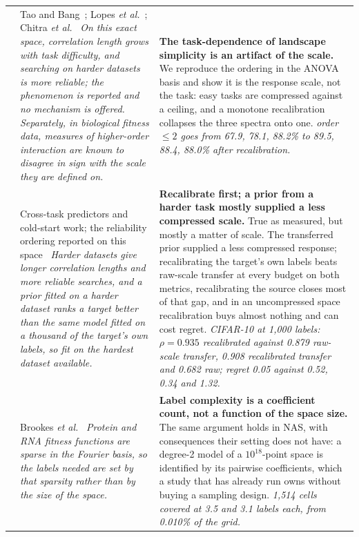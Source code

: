 \begin{table}[!t]
\begin{tabular}{@{}p{}p{}p{}@{}}
\addlinespace[2pt]
3 & Tao and Bang~\cite{tao2024landscape}; Lopes \emph{et al.}~\cite{lopes2024operation}; Chitra \emph{et al.}~\cite{chitra2025resolving} \emph{On this exact space, correlation length grows with task difficulty, and searching on harder datasets is more reliable; the phenomenon is reported and no mechanism is offered. Separately, in biological fitness data, measures of higher-order interaction are known to disagree in sign with the scale they are defined on.} & \textbf{The task-dependence of landscape simplicity is an artifact of the scale.} We reproduce the ordering in the ANOVA basis and show it is the response scale, not the task: easy tasks are compressed against a ceiling, and a monotone recalibration collapses the three spectra onto one. \emph{order $\le 2$ goes from 67.9, 78.1, 88.2\% to 89.5, 88.4, 88.0\% after recalibration.} \\
\addlinespace[2pt]
4 & Cross-task predictors and cold-start work; the reliability ordering reported on this space~\cite{tao2024landscape,lopes2024operation} \emph{Harder datasets give longer correlation lengths and more reliable searches, and a prior fitted on a harder dataset ranks a target better than the same model fitted on a thousand of the target's own labels, so fit on the hardest dataset available.} & \textbf{Recalibrate first; a prior from a harder task mostly supplied a less compressed scale.} True as measured, but mostly a matter of scale. The transferred prior supplied a less compressed response; recalibrating the target's own labels beats raw-scale transfer at every budget on both metrics, recalibrating the source closes most of that gap, and in an uncompressed space recalibration buys almost nothing and can cost regret. \emph{CIFAR-10 at 1{,}000 labels: $\rho=0.935$ recalibrated against 0.879 raw-scale transfer, 0.908 recalibrated transfer and 0.682 raw; regret 0.05 against 0.52, 0.34 and 1.32.} \\
\addlinespace[2pt]
5 & Brookes \emph{et al.}~\cite{brookes2022sparsity} \emph{Protein and RNA fitness functions are sparse in the Fourier basis, so the labels needed are set by that sparsity rather than by the size of the space.} & \textbf{Label complexity is a coefficient count, not a function of the space size.} The same argument holds in NAS, with consequences their setting does not have: a degree-2 model of a $10^{18}$-point space is identified by its pairwise coefficients, which a study that has already run owns without buying a sampling design. \emph{1{,}514 cells covered at 3.5 and 3.1 labels each, from 0.010\% of the grid.} \\

\end{tabular}
\end{table}
